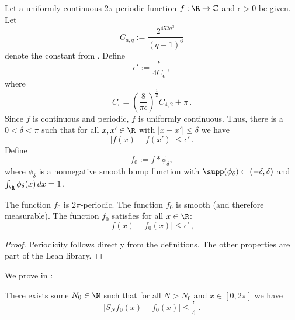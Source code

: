 Let a uniformly continuous $2\pi$-periodic function $f:\R\to \mathbb{C}$ and $\epsilon>0$ be given.
Let
\begin{equation}
    C_{a,q} := \frac{2^{452a^3}}{(q-1)^6}
\end{equation}
denote the constant from .
Define
\begin{equation}
    \epsilon' := \frac {\epsilon} {4 C_\epsilon} \,,
\end{equation}
where
\begin{equation*}
    C_\epsilon = \left(\frac{8}{\pi\epsilon}\right)^\frac{1}{2} C_{4,2} + \pi \,.
\end{equation*}
Since $f$ is continuous and periodic, $f$ is uniformly continuous.
Thus, there is a $0<\delta<\pi$
such that for all $x,x' \in \R$ with $|x-x'|\le \delta$
we have
\begin{equation}\label{uniconbound}
|f(x)-f(x')|\le \epsilon' \, .
\end{equation}
Define
\begin{equation}\label{def-fzero}
f_0:=f \ast \phi_\delta,
\end{equation}
where $\phi_\delta$ is a nonnegative smooth bump function with $\supp (\phi_\delta) \subset (-\delta, \delta)$ and $\int _\R \phi_\delta (x) \, dx = 1$.

\begin{lemma}
\label{smooth-approximation}
\leanok
{}
    The function $f_0$ is $2\pi$-periodic.
    The function $f_0$ is smooth (and therefore measurable).
    The function $f_0$ satisfies for all $x\in \R$:
    \begin{equation}\label{eq-ffzero}
    |f(x)-f_0(x)|\le \epsilon' \, ,
    \end{equation}
\end{lemma}

\begin{proof}
    \leanok
    Periodicity follows directly from the definitions. The other properties are part of the Lean library.
\end{proof}

We prove in :
\begin{lemma}
\label{convergence-for-smooth}
\leanok
    There exists some $N_0 \in \N$ such that for all $N>N_0$ and $x\in [0,2\pi]$ we have
    \begin{equation}
        |S_N f_0 (x)- f_0(x)|\le \frac \epsilon 4\, .
    \end{equation}
\end{lemma}

